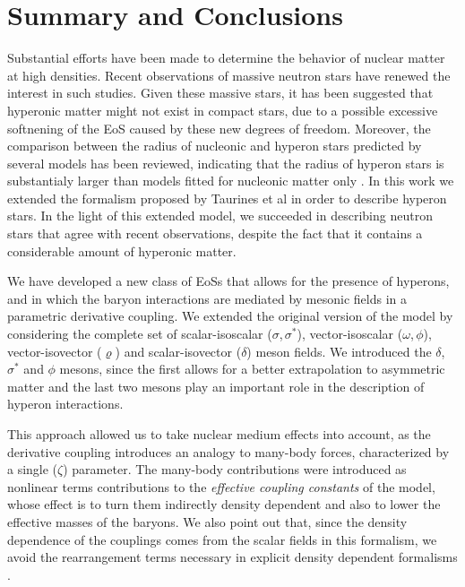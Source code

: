 \documentclass[twocolumn,showpacs,aps]{revtex4}
\begin{document}

\section{Summary and Conclusions}

Substantial efforts have been made to determine the behavior of nuclear matter at high densities.
Recent observations of massive neutron stars 
have renewed the interest in such studies. 
Given these massive stars, it has been suggested that hyperonic matter 
might not exist in compact stars, due to a possible excessive softnening of the EoS caused by these new degrees of freedom. 
Moreover, the comparison between the radius of nucleonic and hyperon stars predicted by several models
has been reviewed, indicating that the radius of hyperon stars is substantialy larger than
models fitted for nucleonic matter only \cite{Fortin:2014mya}.
In this work we extended the formalism proposed by Taurines et al \cite{Taurines:2000zb} 
in order to describe hyperon stars. 
In the light of this extended model, we succeeded in describing neutron stars
that agree with recent observations, despite the fact that it contains a considerable 
amount of hyperonic matter. 


We have developed a new class of EoSs that allows for the presence of hyperons, and in which 
the baryon interactions are mediated by mesonic fields in a parametric derivative coupling. 
We extended the original version of the model by considering the complete set of 
scalar-isoscalar ($\sigma$,$\,\sigma^*$), vector-isoscalar ($\omega$,$\,\phi$), vector-isovector ($\varrho$) 
and scalar-isovector ($\delta$) meson fields.
We introduced the $\delta$, $\sigma^*$ and $\phi$ mesons, since the first allows for a better extrapolation
to asymmetric matter and the last two mesons play an important role in the description of hyperon interactions.

This approach allowed us to take nuclear medium effects into account, as the derivative coupling introduces
an analogy to many-body forces, characterized by a single ($\zeta$) parameter.
The many-body contributions were introduced as nonlinear terms contributions to the \emph{effective coupling constants} 
of the model, whose effect is to turn them indirectly density dependent and also to lower the effective masses of the baryons.
We also point out that, since the density dependence of the couplings comes from the scalar fields in  
this formalism, we avoid the rearrangement terms necessary in explicit density dependent formalisms \cite{Typel:1999yq}.
\end{document}
